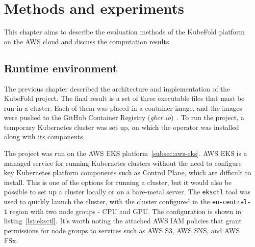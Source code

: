\chapter{Methods and experiments}

This chapter aims to describe the evaluation methods of the KubeFold platform on the AWS cloud and discuss the computation results.

\section{Runtime environment}

The previous chapter described the architecture and implementation of the KubeFold project.
The final result is a set of three executable files that must be run in a cluster.
Each of them was placed in a container image, and the images were pushed to the GitHub Container Registry (\textit{ghcr.io})~\cite{ghcr}.
To run the project, a temporary Kubernetes cluster was set up, on which the operator was installed along with its components.

The project was run on the AWS EKS platform~\ref{subsec:aws-eks}.
AWS EKS is a managed service for running Kubernetes clusters without the need to configure key Kubernetes platform components such as Control Plane, which are difficult to install.
This is one of the options for running a cluster, but it would also be possible to set up a cluster locally or on a bare-metal server.
The \texttt{eksctl} tool was used to quickly launch the cluster, with the cluster configured in the \texttt{eu-central-1} region with two node groups - CPU and GPU.
The configuration is shown in listing~\ref{lst:eksctl}.
It's worth noting the attached AWS IAM policies that grant permissions for node groups to services such as AWS S3, AWS SNS, and AWS FSx.

